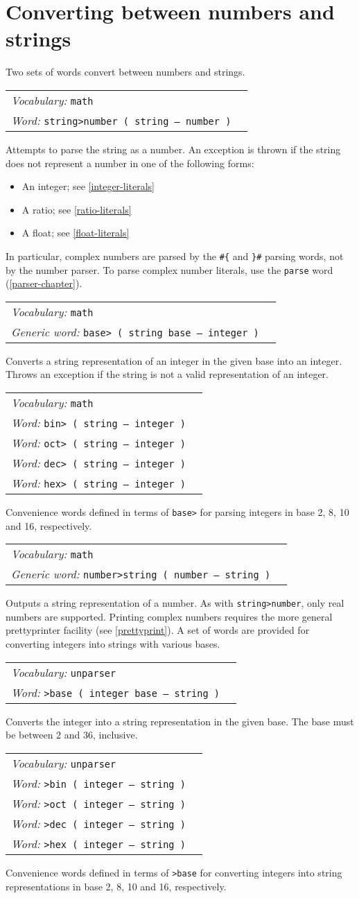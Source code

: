 \documentclass{book}
\newcommand{\vocabulary}[1]{\emph{Vocabulary:} \texttt{#1}&\\}
\newcommand{\ordinaryword}[2]{\index{\texttt{#1}}\emph{Word:} \texttt{#2}&\\}
\newcommand{\genericword}[2]{\index{\texttt{#1}}\emph{Generic word:} \texttt{#2}&\\}
\newcommand{\wordtable}[1]{


\begin{tabularx}{12cm}{lX}
\hline
#1
\hline
\end{tabularx}

}
\begin{document}
\section{Converting between numbers and strings}\label{parsing-numbers}

Two sets of words convert between numbers and strings.

\wordtable{
\vocabulary{math}
\ordinaryword{string>number}{string>number~( string -- number )}
}
Attempts to parse the string as a number. An exception is thrown if the string does not represent a number in one of the following forms:
\begin{itemize}
\item An integer; see \ref{integer-literals}
\item A ratio; see \ref{ratio-literals}
\item A float; see \ref{float-literals}
\end{itemize}
In particular, complex numbers are parsed by the \verb|#{| and \verb|}#| parsing words, not by the number parser. To parse complex number literals, use the \texttt{parse} word (\ref{parser-chapter}).
\wordtable{
\vocabulary{math}
\genericword{base>}{base>~( string base -- integer )}
}
Converts a string representation of an integer in the given base into an integer. Throws an exception if the string is not a valid representation of an integer.
\wordtable{
\vocabulary{math}
\ordinaryword{bin>}{bin>~( string -- integer )}
\ordinaryword{oct>}{oct>~( string -- integer )}
\ordinaryword{dec>}{dec>~( string -- integer )}
\ordinaryword{hex>}{hex>~( string -- integer )}
}
Convenience words defined in terms of \texttt{base>} for parsing integers in base 2, 8, 10 and 16, respectively.

\wordtable{
\vocabulary{math}
\genericword{number>string}{number>string~( number -- string~)}
}
Outputs a string representation of a number. As with \verb|string>number|, only real numbers are supported. Printing complex numbers requires the more general prettyprinter facility (see \ref{prettyprint}).
A set of words are provided for converting integers into strings with various bases.
\wordtable{
\vocabulary{unparser}
\ordinaryword{>base}{>base~( integer base -- string~)}
}
Converts the integer into a string representation in the given base. The base must be between 2 and 36, inclusive.
\wordtable{
\vocabulary{unparser}
\ordinaryword{>bin}{>bin~( integer -- string~)}
\ordinaryword{>oct}{>oct~( integer -- string~)}
\ordinaryword{>dec}{>dec~( integer -- string~)}
\ordinaryword{>hex}{>hex~( integer -- string~)}
}
Convenience words defined in terms of \texttt{>base} for converting integers into string representations in base 2, 8, 10 and 16, respectively.
\end{document}

